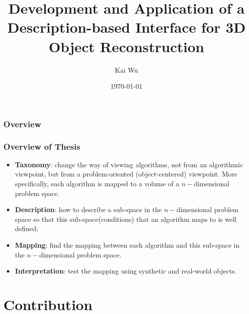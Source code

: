 \documentclass{beamer}
\title[Interface of 3D Reconstruction]{Development and Application of a Description-based Interface for 3D Object Reconstruction} %
\author{Kai Wu} %
\institute[UBC] %
{
University of British Columbia \\ %
\medskip
\textit{kaywu@ece.ubc.ca} %
}
\date{\today} %
\begin{document}
\begin{frame}
\titlepage %
\end{frame}

\begin{frame}
\frametitle{Overview} %
\tableofcontents %
\end{frame}

\begin{frame}
\frametitle{Overview of Thesis}

\begin{itemize}
\item \textbf{Taxonomy}: change the way of viewing algorithms, not from an algorithmic viewpoint, but from a problem-oriented (object-centered) viewpoint. More specifically, each algorithm is mapped to a volume of a $n-$dimensional problem space.
\item \textbf{Description}: how to describe a sub-space in the $n-$dimensional problem space so that this sub-space(conditions) that an algorithm maps to is well defined;
\item \textbf{Mapping}: find the mapping between each algorithm and this sub-space in the $n-$dimensional problem space.
\item \textbf{Interpretation}: test the mapping using synthetic and real-world objects.
\end{itemize}
\end{frame}

\section{Contribution} %
\end{document}
